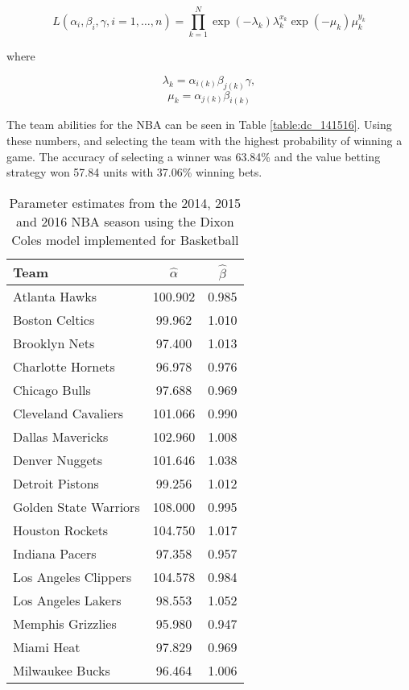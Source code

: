 \begin{equation} \label{eq:dc_likelihood}
L(\alpha_i,\beta_i,\gamma, i=1,\ldots,n) = \prod_{k=1}^{N} \exp(-\lambda_k)\lambda_{k}^{x_k}\exp(-\mu_k)\mu_{k}^{y_k}
\end{equation}

where

$$\lambda_k = \alpha_{i(k)}\beta_{j(k)}\gamma,$$
$$\mu_k = \alpha_{j(k)}\beta_{i(k)}$$

The team abilities for the NBA can be seen in Table \ref{table:dc_141516}.  Using these numbers, and selecting the team with the highest probability of winning a game.  The accuracy of selecting a winner was 63.84\% and the value betting strategy won 57.84 units with 37.06\% winning bets.

\begin{table}[t]
	\centering
	\caption{Parameter estimates from the 2014, 2015 and 2016 NBA season using the Dixon Coles model implemented for Basketball}
	\begin{tabular}{|l|c|c|}
		\hline
		\textbf{Team}  & \textbf{$\hat{\alpha}$} & \textbf{$\hat{\beta}$} \\ \hline
		Atlanta Hawks  & 100.902 & 0.985\\ \hline
		Boston Celtics & 99.962 & 1.010\\ \hline
		Brooklyn Nets  & 97.400 & 1.013\\ \hline
		Charlotte Hornets & 96.978 & 0.976\\ \hline
		Chicago Bulls & 97.688 & 0.969\\ \hline
		Cleveland Cavaliers & 101.066 & 0.990\\ \hline
		Dallas Mavericks & 102.960 & 1.008 \\ \hline
		Denver Nuggets & 101.646 & 1.038\\ \hline
		Detroit Pistons & 99.256 & 1.012\\ \hline
		Golden State Warriors & 108.000 & 0.995\\ \hline
		Houston Rockets & 104.750 & 1.017 \\ \hline
		Indiana Pacers & 97.358 & 0.957 \\ \hline
		Los Angeles Clippers & 104.578 & 0.984\\ \hline
		Los Angeles Lakers & 98.553 & 1.052 \\ \hline
		Memphis Grizzlies & 95.980 & 0.947\\ \hline
		Miami Heat & 97.829 & 0.969\\ \hline
		Milwaukee Bucks & 96.464 & 1.006\\ \hline

\end{tabular}
\end{table}
